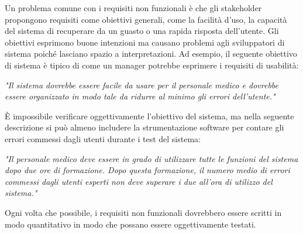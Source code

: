 Un problema comune con i requisiti non funzionali è che gli stakeholder propongono requisiti come obiettivi generali, come la facilità d'uso, la capacità del sistema di recuperare da un guasto o una rapida risposta dell'utente. Gli obiettivi esprimono buone intenzioni ma causano problemi agli sviluppatori di sistema poiché lasciano spazio a interpretazioni. Ad esempio, il seguente obiettivo di sistema è tipico di come un manager potrebbe esprimere i requisiti di usabilità:
\begin{center}
    \begin{minipage}{0.9\textwidth}
    \textit{"Il sistema dovrebbe essere facile da usare per il personale medico e dovrebbe essere organizzato in modo tale da ridurre al minimo gli errori dell'utente."}
    \end{minipage}
\end{center}
È impossibile verificare oggettivamente l'obiettivo del sistema, ma nella seguente descrizione si può almeno includere la strumentazione software per contare gli errori commessi dagli utenti durante i test del sistema:
\begin{center}
    \begin{minipage}{0.9\textwidth}
    \textit{"Il personale medico deve essere in grado di utilizzare tutte le funzioni del sistema dopo due ore di formazione. Dopo questa formazione, il numero medio di errori commessi dagli utenti esperti non deve superare i due all'ora di utilizzo del sistema."}
   \end{minipage}
\end{center}
Ogni volta che possibile, i requisiti non funzionali dovrebbero essere scritti in modo quantitativo in modo che possano essere oggettivamente testati.

